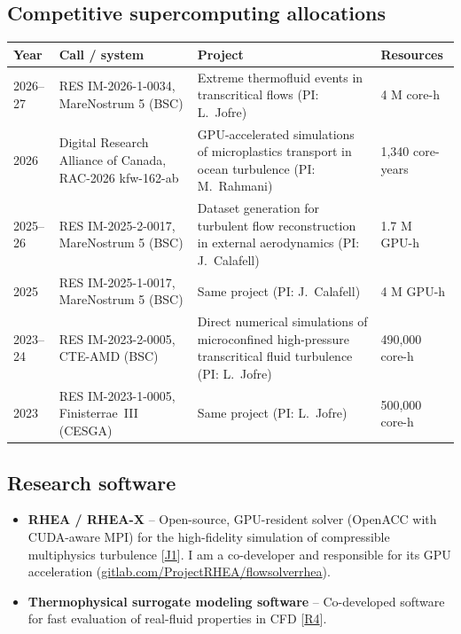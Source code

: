 \documentclass[11pt]{article}
\begin{document}
\subsection{Competitive supercomputing allocations}\label{sec:hpc}
\begin{center}\small
\begin{tabularx}{\textwidth}{@{}p{1.4cm}p{3.3cm}Xp{2.4cm}@{}}
\toprule
\textbf{Year} & \textbf{Call / system} & \textbf{Project} & \textbf{Resources} \\
\midrule
2026--27 & RES IM-2026-1-0034, MareNostrum 5 (BSC) & Extreme thermofluid events in transcritical flows (PI: L.\ Jofre) & 4 M core-h \\
2026 & Digital Research Alliance of Canada, RAC-2026 kfw-162-ab & GPU-accelerated simulations of microplastics transport in ocean turbulence (PI: M.\ Rahmani) & 1,340 core-years \\
2025--26 & RES IM-2025-2-0017, MareNostrum 5 (BSC) & Dataset generation for turbulent flow reconstruction in external aerodynamics (PI: J.\ Calafell) & 1.7 M GPU-h \\
2025 & RES IM-2025-1-0017, MareNostrum 5 (BSC) & Same project (PI: J.\ Calafell) & 4 M GPU-h \\
2023--24 & RES IM-2023-2-0005, CTE-AMD (BSC) & Direct numerical simulations of microconfined high-pressure transcritical fluid turbulence (PI: L.\ Jofre) & 490,000 core-h \\
2023 & RES IM-2023-1-0005, Finisterrae~III (CESGA) & Same project (PI: L.\ Jofre) & 500,000 core-h \\
\bottomrule
\end{tabularx}
\end{center}

\subsection{Research software}
\begin{itemize}
  \item \textbf{RHEA / RHEA-X} -- Open-source, GPU-resident solver (OpenACC with CUDA-aware MPI) for
  the high-fidelity simulation of compressible multiphysics turbulence
  [\hyperlink{pub-J1}{J1}]. I am a co-developer and responsible for its GPU acceleration (\href{https://gitlab.com/ProjectRHEA/flowsolverrhea}{gitlab.com/ProjectRHEA/flowsolverrhea}).
  
  \item \textbf{Thermophysical surrogate modeling software} -- Co-developed software for fast evaluation of real-fluid properties in CFD [\hyperlink{pub-R4}{R4}].
\end{itemize}
\end{document}
